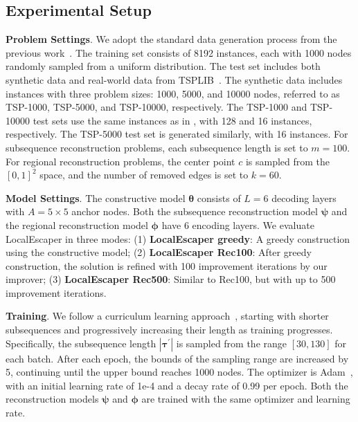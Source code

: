 

\subsection{Experimental Setup}
\textbf{Problem Settings}. We adopt the standard data generation process from the previous work~\cite{kool2018attention}. 
The training set consists of 8192 instances, each with 1000 nodes randomly sampled from a uniform distribution. 
The test set includes both synthetic data and real-world data from TSPLIB~\cite{reinelt1991tsplib}. 
The synthetic data includes instances with three problem sizes: 1000, 5000, and 10000 nodes, referred to as TSP-1000, TSP-5000, and TSP-10000, respectively.  
The TSP-1000 and TSP-10000 test sets use the same instances as in \citet{fu2021generalize}, with 128 and 16 instances, respectively. The TSP-5000 test set is generated similarly, with 16 instances. 
For subsequence reconstruction problems, each subsequence length is set to $m=100$. For regional reconstruction problems, the center point $c$ is sampled from the $[0,1]^2$ space, and the number of removed edges is set to $k=60$. 

\textbf{Model Settings}. The constructive model $\boldsymbol{\theta}$ consists of  $L=6$ decoding layers with $A = 5 \times 5$ anchor nodes. Both the subsequence reconstruction model $\boldsymbol{\psi}$ and the regional reconstruction model $\boldsymbol{\phi}$ have 6 encoding layers.  
We evaluate LocalEscaper in three modes: 
(1) \textbf{LocalEscaper greedy}: A greedy construction using the constructive model; 
(2) \textbf{LocalEscaper Rec100}: After greedy construction, the solution is refined with 100 improvement iterations by our improver; 
(3) \textbf{LocalEscaper Rec500}: Similar to Rec100, but with up to 500 improvement iterations. 

\textbf{Training}. We follow a curriculum learning approach~\cite{wang2021survey}, starting with shorter subsequences and progressively increasing their length as training progresses.  Specifically, the subsequence length $|\boldsymbol{\tau}^{\prime}|$ is sampled from the range $[30,130]$ for each batch. 
After each epoch, the bounds of the sampling range are increased by 5, continuing until the upper bound reaches 1000 nodes. 
The optimizer is Adam~\cite{kingma2014adam}, with an initial learning rate of 1e-4 and a decay rate of 0.99 per epoch. Both the reconstruction models $\boldsymbol{\psi}$ and $\boldsymbol{\phi}$ are trained with the same optimizer and learning rate. 


